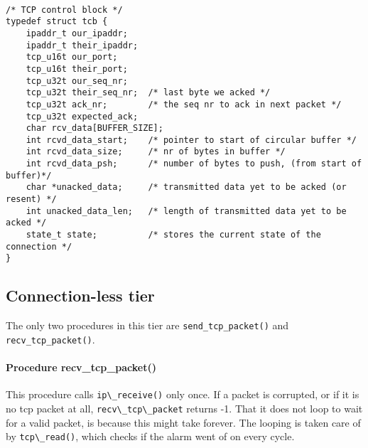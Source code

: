 \documentclass[11pt]{article}
\begin{document}
\paragraph{}


\begin{lstlisting}[title=The TCP Control Block structure]
/* TCP control block */
typedef struct tcb {
    ipaddr_t our_ipaddr;
    ipaddr_t their_ipaddr;
    tcp_u16t our_port;
    tcp_u16t their_port;
    tcp_u32t our_seq_nr;
    tcp_u32t their_seq_nr;  /* last byte we acked */
    tcp_u32t ack_nr;        /* the seq nr to ack in next packet */
    tcp_u32t expected_ack;  
    char rcv_data[BUFFER_SIZE];
    int rcvd_data_start;    /* pointer to start of circular buffer */
    int rcvd_data_size;     /* nr of bytes in buffer */
    int rcvd_data_psh;      /* number of bytes to push, (from start of buffer)*/
    char *unacked_data;     /* transmitted data yet to be acked (or resent) */
    int unacked_data_len;   /* length of transmitted data yet to be acked */
    state_t state;          /* stores the current state of the connection */
}

\end{lstlisting}


\paragraph{}


\subsection{Connection-less tier}

The only two procedures in this tier are \lstinline|send_tcp_packet()| and
\lstinline|recv_tcp_packet()|.

\paragraph{Procedure recv\_tcp\_packet()}
This procedure calls \lstinline|ip\_receive()| only once. If a packet is corrupted,
or if it is no tcp packet at all, \lstinline|recv\_tcp\_packet| returns -1.
That it does not loop to wait for a valid packet, is because this might take 
forever. The looping is taken care of by \lstinline|tcp\_read()|, which checks if the alarm 
went of on every cycle.
\end{document}
